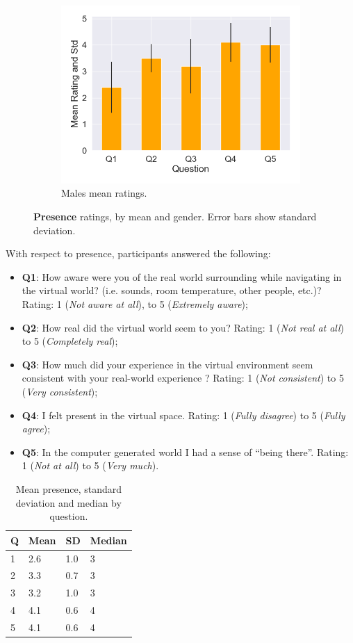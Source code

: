 \begin{figure}[H]
 \begin{subfigure}[b]{\textwidth}
 \centering
 \includegraphics[scale=0.5]{Files/Plots/presence_mean_ratings_m.png}
 \caption{Males mean ratings.}
 \label{fig:presMale}
 \end{subfigure}
 \caption{\textbf{Presence} ratings, by mean and gender. Error bars show standard deviation.}
\label{fig:presAll}
\end{figure}
With respect to presence, participants answered the following:
 \begin{itemize}
\itemsep0em
    \item \textbf{Q1}: How aware were you of the real world surrounding while navigating in the virtual world? (i.e. sounds, room temperature, other people, etc.)? Rating: 1 (\textit{Not aware at all}), to 5 (\textit{Extremely aware});
    \item \textbf{Q2}: How real did the virtual world seem to you? Rating: 1 (\textit{Not real at all}) to 5 (\textit{Completely real});
    \item \textbf{Q3}: How much did your experience in the virtual environment seem consistent with your real-world experience ?  Rating: 1 (\textit{Not consistent}) to 5 (\textit{Very consistent});
    \item \textbf{Q4}: I felt present in the virtual space. Rating: 1 (\textit{Fully disagree}) to 5 (\textit{Fully agree});
    \item \textbf{Q5}: In the computer generated world I had a sense of ``being there''.  Rating: 1 (\textit{Not at all}) to 5 (\textit{Very much}). 
\end{itemize}
\begin{table}[H]
\centering
\begin{tabular}{|llll|}
\hline
Q & Mean & SD & Median \\
\hline
1 &  2.6 & 1.0&3\\  
2 &  3.3 & 0.7&3\\ 
3 &  3.2 & 1.0&3\\ 
4 &  4.1 & 0.6&4\\  
5 &  4.1 & 0.6&4\\  
\hline
\end{tabular}
\caption{Mean presence, standard deviation and median by question.}
\label{tbl:pres}
\end{table} 
